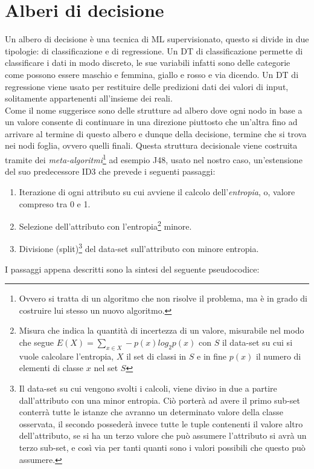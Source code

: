 \section{Alberi di decisione} 
Un albero di decisione è una tecnica di ML supervisionato, questo si divide in due tipologie: di classificazione e di regressione.
Un DT di classificazione permette di classificare i dati in modo discreto, le sue variabili infatti sono delle categorie come possono essere maschio e femmina, giallo e rosso e via dicendo.
Un DT di regressione viene usato per restituire delle predizioni dati dei valori di input, solitamente appartenenti all'insieme dei reali.\\
Come il nome suggerisce sono delle strutture ad albero dove ogni nodo in base a un valore consente di continuare in una direzione piuttosto che un'altra fino ad arrivare al termine di questo albero e dunque della decisione, termine che si trova nei nodi foglia, ovvero quelli finali.
Questa struttura decisionale viene costruita tramite dei \emph{meta-algoritmi}\footnote{Ovvero si tratta di un algoritmo che non risolve il problema, ma è in grado di costruire lui stesso un nuovo algoritmo.} ad esempio J48, usato nel nostro caso, un'estensione del suo predecessore ID3 che prevede i seguenti passaggi:
\newpage
\begin{enumerate}
	\item Iterazione di ogni attributo su cui avviene il calcolo dell'\emph{entropia}, o, valore compreso tra 0 e 1.
	\item Selezione dell'attributo con l'entropia\footnote{Misura che indica la quantità di incertezza di un valore, misurabile nel modo che segue $E\left(X\right) = \sum_{x\in X} -p\left(x\right)log_{2}p(x)$ con $S$ il data-set su cui si vuole calcolare l'entropia, $X$ il set di classi in $S$ e in fine $p\left(x\right)$ il numero di elementi di classe $x$ nel set $S$} minore.
	\item Divisione (split)\footnote{Il data-set su cui vengono svolti i calcoli, viene diviso in due a partire dall'attributo con una minor entropia. Ciò porterà ad avere il primo sub-set conterrà tutte le istanze che avranno un determinato valore della classe osservata, il secondo possederà invece tutte le tuple contenenti il valore altro dell'attributo, se si ha un terzo valore che può assumere l'attributo si avrà un terzo sub-set, e così via per tanti quanti sono i valori possibili che questo può assumere.} del data-set sull'attributo con minore entropia.
\end{enumerate}
I passaggi appena descritti sono la sintesi del seguente pseudocodice:

